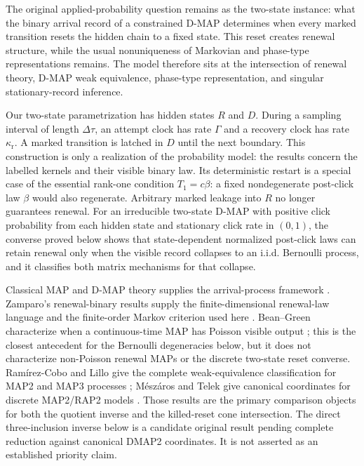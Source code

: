The original applied-probability question remains as the two-state instance:
what the binary arrival record of a constrained D-MAP determines when every
marked transition resets the hidden chain to a fixed state.  This reset creates
renewal structure, while the usual nonuniqueness of Markovian and phase-type
representations remains.  The model therefore sits at the intersection of
renewal theory, D-MAP weak equivalence, phase-type representation, and singular
stationary-record inference.

Our two-state parametrization has hidden states \(R\) and \(D\).  During a
sampling interval of length \(\Delta\tau\), an attempt clock has rate
\(\Gamma\) and a recovery clock has rate \(\kappa_{\mathrm r}\).  A marked
transition is latched in \(D\) until the next boundary.  This construction is
only a realization of the probability model: the results concern the labelled
kernels and their visible binary law.  Its deterministic restart is a
special case of the essential rank-one condition \(T_1=c\beta\): a fixed
nondegenerate post-click law \(\beta\) would also regenerate.  Arbitrary
marked leakage into \(R\) no longer guarantees renewal.  For an irreducible
two-state D-MAP with positive click probability from each hidden state and
stationary click rate in \((0,1)\), the converse proved below shows that
state-dependent normalized post-click laws can retain renewal only when the
visible record collapses to an i.i.d. Bernoulli process, and it classifies both
matrix mechanisms for that collapse.

Classical MAP and D-MAP theory supplies the arrival-process framework
\cite{Neuts1979MAP,Lucantoni1991BMAP,AlfaNeuts1995DMAP}.  Zamparo's
renewal-binary results supply the finite-dimensional renewal-law language and
the finite-order Markov criterion used here \cite{Zamparo2022RenewalBinary}.
Bean--Green characterize when a continuous-time MAP has Poisson visible output
\cite{BeanGreen2000MAPPoisson}; this is the closest antecedent for the
Bernoulli degeneracies below, but it does not characterize non-Poisson renewal
MAPs or the discrete two-state reset converse.
Ram\'irez-Cobo and Lillo give the complete weak-equivalence classification for
MAP2 and MAP3 processes \cite{RamirezCoboLillo2012WeakEquivalentMAP};
M\'esz\'aros and Telek give canonical coordinates for discrete MAP2/RAP2
models \cite{MeszarosTelek2013DiscreteMAP2Canonical}.  Those results are the
primary comparison objects for both the quotient inverse and the killed-reset
cone intersection.  The direct three-inclusion inverse below is a candidate
original result pending complete reduction against canonical DMAP2
coordinates.  It is not asserted as an established priority claim.

